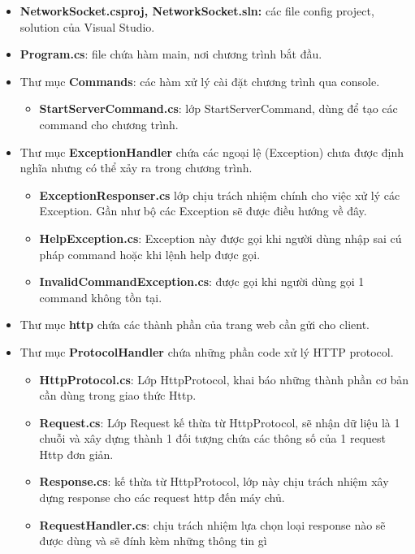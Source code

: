 \documentclass[14pt, a4paper]{extarticle}
\begin{document}
\begin{itemize}
    \item \textbf{NetworkSocket.csproj, NetworkSocket.sln:} các file config project, solution của Visual Studio.
    \item \textbf{Program.cs}: file chứa hàm main, nơi chương trình bắt đầu.
    \item Thư mục \textbf{Commands}: các hàm xử lý cài đặt chương trình qua console.
    \begin{itemize}
        \item \textbf{StartServerCommand.cs}: lớp StartServerCommand, dùng để tạo các command cho chương trình.
    \end{itemize}
    \item  Thư mục \textbf{ExceptionHandler} chứa các ngoại lệ (Exception) chưa được định nghĩa nhưng có thể xảy ra trong chương trình.
    \begin{itemize}
        \item \textbf{ExceptionResponser.cs} lớp chịu trách nhiệm chính cho việc xử lý các Exception. Gần như bộ các Exception sẽ được điều hướng về đây.
        \item \textbf{HelpException.cs}: Exception này được gọi khi người dùng nhập sai cú pháp command hoặc khi lệnh help được gọi.
        \item \textbf{InvalidCommandException.cs}: được gọi khi người dùng gọi 1 command không tồn tại.
    \end{itemize}
    \item Thư mục \textbf{http} chứa các thành phần của trang web cần gửi cho client.
    \item Thư mục \textbf{ProtocolHandler} chứa những phần code xử lý HTTP protocol.
    \begin{itemize}
        \item  \textbf{HttpProtocol.cs}: Lớp HttpProtocol, khai báo những thành phần cơ bản cần dùng trong giao thức Http.
        \item \textbf{Request.cs}: Lớp Request kế thừa từ HttpProtocol, sẽ nhận dữ liệu là 1 chuỗi và xây dựng thành 1 đối tượng chứa các thông số của 1 request Http đơn giản.
        \item \textbf{Response.cs}: kế thừa từ HttpProtocol, lớp này chịu trách nhiệm xây dựng response cho các request http đến máy chủ.
        \item \textbf{RequestHandler.cs}: chịu trách nhiệm lựa chọn loại response nào sẽ được dùng và sẽ đính kèm những thông tin gì
    \end{itemize}

\end{itemize}
\end{document}
